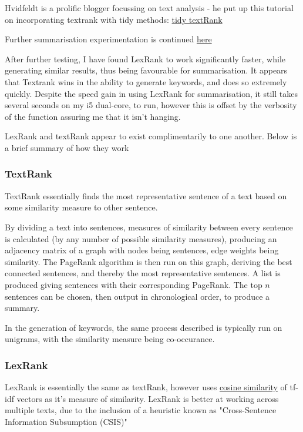 \documentclass[a4paper, 11pt]{article}
\begin{document}
Hvidfeldt is a prolific blogger focussing on text analysis - he put up
this tutorial on incorporating textrank with tidy methods: \href{https://www.hvitfeldt.me/blog/tidy-text-summarization-using-textrank/}{tidy
textRank}

Further summarisation experimentation is continued \href{summarisation\_experimentation.Rmd}{here}

After further testing, I have found LexRank to work significantly
faster, while generating similar results, thus being favourable for
summarisation. It appears that Textrank wins in the ability to
generate keywords, and does so extremely quickly. Despite the speed
gain in using LexRank for summarisation, it still takes several
seconds on my i5 dual-core, to run, however this is offset by the
verbosity of the function assuring me that it isn't hanging.

LexRank and textRank appear to exist complimentarily to one another.
Below is a brief summary of how they work

\subsubsection{TextRank}
\label{sec:orgd28bb50}

TextRank essentially finds the most representative sentence of a text
based on some similarity measure to other sentence.

By dividing a text into sentences, measures of similarity between every
sentence is calculated (by any number of possible similarity measures),
producing an adjacency matrix of a graph with nodes being sentences,
edge weights being similarity. The PageRank algorithm is then run on
this graph, deriving the best connected sentences, and thereby the most
representative sentences. A list is produced giving sentences with their
corresponding PageRank. The top \(n\) sentences can be chosen, then output
in chronological order, to produce a summary.

In the generation of keywords, the same process described is typically
run on unigrams, with the similarity measure being co-occurance.

\subsubsection{LexRank}
\label{sec:org18e1ca8}
LexRank is essentially the same as textRank, however uses
\href{https://en.wikipedia.org/wiki/Cosine\_similarity}{cosine similarity} of tf-idf vectors as it's measure of similarity. LexRank is better at
working across multiple texts, due to the inclusion of a heuristic known
as "Cross-Sentence Information Subsumption (CSIS)"
\end{document}
